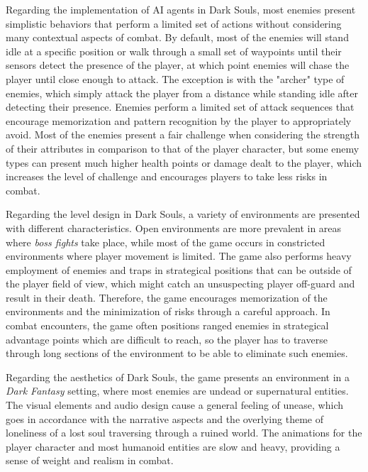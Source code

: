 Regarding the implementation of AI agents in Dark Souls, most enemies present simplistic behaviors that perform a limited set of actions without considering many contextual aspects of combat. By default, most of the enemies will stand idle at a specific position or walk through a small set of waypoints until their sensors detect the presence of the player, at which point enemies will chase the player until close enough to attack. The exception is with the "archer" type of enemies, which simply attack the player from a distance while standing idle after detecting their presence. Enemies perform a limited set of attack sequences that encourage memorization and pattern recognition by the player to appropriately avoid. Most of the enemies present a fair challenge when considering the strength of their attributes in comparison to that of the player character, but some enemy types can present much higher health points or damage dealt to the player, which increases the level of challenge and encourages players to take less risks in combat.

Regarding the level design in Dark Souls, a variety of environments are presented with different characteristics. Open environments are more prevalent in areas where \emph{boss fights} take place, while most of the game occurs in constricted environments where player movement is limited. The game also performs heavy employment of enemies and traps in strategical positions that can be outside of the player field of view, which might catch an unsuspecting player off-guard and result in their death. Therefore, the game encourages memorization of the environments and the minimization of risks through a careful approach. In combat encounters, the game often positions ranged enemies in strategical advantage points which are difficult to reach, so the player has to traverse through long sections of the environment to be able to eliminate such enemies.  

Regarding the aesthetics of Dark Souls, the game presents an environment in a \emph{Dark Fantasy} setting, where most enemies are undead or supernatural entities. The visual elements and audio design cause a general feeling of unease, which goes in accordance with the narrative aspects and the overlying theme of loneliness of a lost soul traversing through a ruined world. The animations for the player character and most humanoid entities are slow and heavy, providing a sense of weight and realism in combat.

